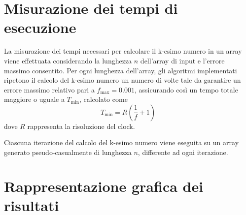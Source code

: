 \documentclass[a4paper]{article}
\begin{document}
\section{Misurazione dei tempi di esecuzione}
La misurazione dei tempi necessari per calcolare il k-esimo numero in un array viene effettuata considerando la lunghezza \( n \) dell'array di input e l'errore massimo consentito. Per ogni lunghezza dell'array, gli algoritmi implementati ripetono il calcolo del k-esimo numero un numero di volte tale da garantire un errore massimo relativo pari a \( f_{\max} = 0.001 \), assicurando così un tempo totale maggiore o uguale a \( T_{\min} \), calcolato come \[ T_{\min} = R \left( \frac{1}{f} + 1 \right) \] dove \( R \) rappresenta la risoluzione del clock.

Ciascuna iterazione del calcolo del k-esimo numero viene eseguita su un array generato pseudo-casualmente di lunghezza \( n \), differente ad ogni iterazione.
\newpage
\section{Rappresentazione grafica dei risultati}
\end{document}
